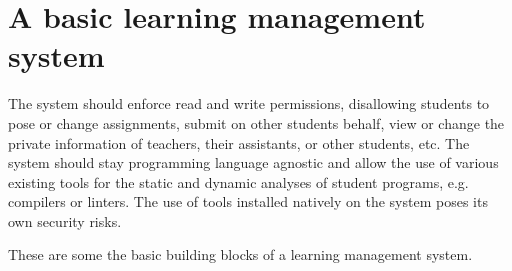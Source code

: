 
\section{A basic learning management system}

The system should enforce read and write permissions, disallowing students to
pose or change assignments, submit on other students behalf, view or change the
private information of teachers, their assistants, or other students, etc. The
system should stay programming language agnostic and allow the use of various
existing tools for the static and dynamic analyses of student programs, e.g.
compilers or linters. The use of tools installed natively on the system poses
its own security risks.

These are some the basic building blocks of a learning management
system\cite{lms}.

